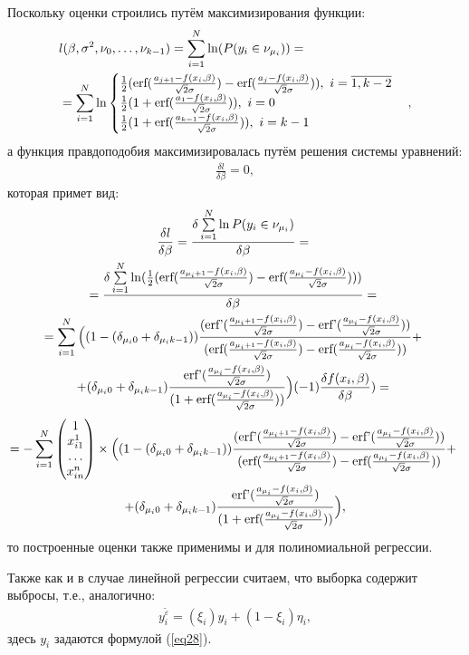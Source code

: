 Поскольку оценки строились путём максимизирования функции:
\begin{eqnarray}
    &l(\beta,\sigma^2, \nu_0,\dots, \nu_{k-1})=\sum_{i=1}^{N}\ln(P(y_i\in \nu_{\mu_i}))=\\
    &=\sum\limits_{i=1}^{N}\ln\begin{cases}
        \frac{1}{2}(\textup{erf}(\frac{a_{j+1}-f(x_i,\beta)}{\sqrt{2}\sigma})-\textup{erf}(\frac{a_{j}-f(x_i,\beta)}{\sqrt{2}\sigma})),~i=\overline{1,k-2}\\
        \frac{1}{2}(1+\textup{erf}(\frac{a_{1}-f(x_i,\beta)}{\sqrt{2}\sigma})),~i=0\\
        \frac{1}{2}(1+\textup{erf}(\frac{a_{k-1}-f(x_i,\beta)}{\sqrt{2}\sigma})),~i=k-1
    \end{cases},
\end{eqnarray}
а функция правдоподобия максимизировалась путём решения системы уравнений:
\begin{eqnarray}
    \frac{\delta l}{\delta \beta}=0,
\end{eqnarray}
которая примет вид:
\begin{multline}
    \frac{\delta l}{\delta \beta}=\frac{\delta \sum\limits_{i=1}^{N}\ln P(y_i\in \nu_{\mu_i})}{\delta \beta}=~\\
    =\frac{\delta \sum\limits_{i=1}^{N} \ln(\frac{1}{2}(\textup{erf}(\frac{a_{\mu_i+1}-f(x_i,\beta)}{\sqrt{2}\sigma})-\textup{erf}(\frac{a_{\mu_i}-f(x_i,\beta)}{\sqrt{2}\sigma})) )         }{\delta \beta}=~\\
    =  \sum\limits_{i=1}^{N}\Big((1-(\delta_{\mu_i 0}+\delta_{\mu_i k-1}))\frac{(\textup{erf'}(\frac{a_{\mu_i+1}-f(x_i,\beta)}{\sqrt{2}\sigma})-\textup{erf'}(\frac{a_{\mu_i}-f(x_i,\beta)}{\sqrt{2}\sigma}))}{ (\textup{erf}(\frac{a_{\mu_i+1}-f(x_i,\beta)}{\sqrt{2}\sigma})-\textup{erf}(\frac{a_{\mu_i}-f(x_i,\beta)}{\sqrt{2}\sigma}))}+~\\
    +(\delta_{\mu_i 0}+\delta_{\mu_i k-1})\frac{\textup{erf'}(\frac{a_{\mu_i}-f(x_i,\beta)}{\sqrt{2}\sigma})}{(1+\textup{erf}(\frac{a_{\mu_i}-f(x_i,\beta)}{\sqrt{2}\sigma}))}\Big)  (-1) \frac{\delta f(x_i,\beta)}{\delta \beta} )=~
\end{multline}
\begin{multline}
    \nonumber 
    =-\sum_{i=1}^{N}\begin{pmatrix}
        1\\
        x_{i1}^1\\
        \dots\\
        x_{in}^n
    \end{pmatrix}\times  \Big((1-(\delta_{\mu_i 0}+\delta_{\mu_i k-1}))\frac{(\textup{erf'}(\frac{a_{\mu_i+1}-f(x_i,\beta)}{\sqrt{2}\sigma})-\textup{erf'}(\frac{a_{\mu_i}-f(x_i,\beta)}{\sqrt{2}\sigma}))}{ (\textup{erf}(\frac{a_{\mu_i+1}-f(x_i,\beta)}{\sqrt{2}\sigma})-\textup{erf}(\frac{a_{\mu_i}-f(x_i,\beta)}{\sqrt{2}\sigma}))}+~\\
    +(\delta_{\mu_i 0}+\delta_{\mu_i k-1})\frac{\textup{erf'}(\frac{a_{\mu_i}-f(x_i,\beta)}{\sqrt{2}\sigma})}{(1+\textup{erf}(\frac{a_{\mu_i}-f(x_i,\beta)}{\sqrt{2}\sigma}))}\Big),
\end{multline}
то построенные оценки также применимы и для полиномиальной регрессии.

Также как и в случае линейной регрессии считаем, что выборка содержит выбросы, т.е., аналогично:
\begin{eqnarray}
    y_i^{\widetilde{\varepsilon}}=(\xi_i)y_i+ (1-\xi_i)\eta_i,
\end{eqnarray}
здесь $y_i$ задаются формулой (\ref{eq28}).

